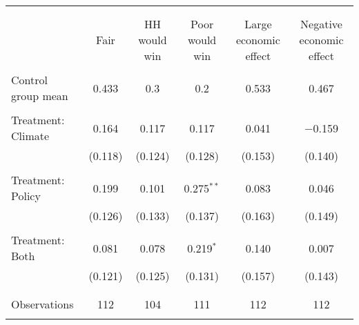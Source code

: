 
\begin{tabular}{@{\extracolsep{5pt}}lccccc} 
\\[-1.8ex]\hline 
\hline \\[-1.8ex] 
\\[-1.8ex] & Fair & HH would win & Poor would win & Large economic effect & Negative economic effect \\ 
\hline \\[-1.8ex] 
 Control group mean & 0.433 & 0.3 & 0.2 & 0.533 & 0.467  \\ \hline \\[-1.8ex] Treatment: Climate & 0.164 & 0.117 & 0.117 & 0.041 & $-$0.159 \\ 
  & (0.118) & (0.124) & (0.128) & (0.153) & (0.140) \\ 
  & & & & & \\ 
 Treatment: Policy & 0.199 & 0.101 & 0.275$^{**}$ & 0.083 & 0.046 \\ 
  & (0.126) & (0.133) & (0.137) & (0.163) & (0.149) \\ 
  & & & & & \\ 
 Treatment: Both & 0.081 & 0.078 & 0.219$^{*}$ & 0.140 & 0.007 \\ 
  & (0.121) & (0.125) & (0.131) & (0.157) & (0.143) \\ 
  & & & & & \\ 
\hline \\[-1.8ex] 

Observations & 112 & 104 & 111 & 112 & 112 \\ 
\hline 
\hline \\[-1.8ex] 
\end{tabular} 